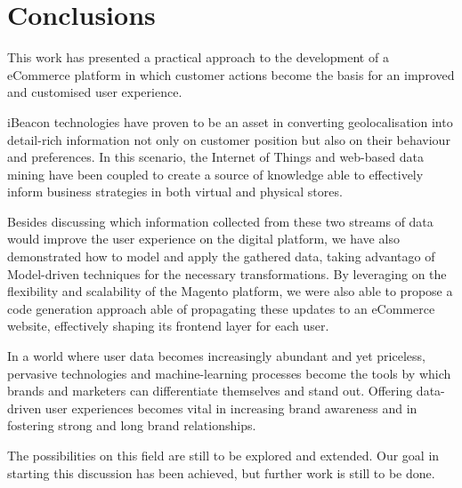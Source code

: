 \chapter*{Conclusions}

This work has presented a practical approach to the development of a eCommerce platform in which customer actions become the basis for an improved and customised user experience.

iBeacon technologies have proven to be an asset in converting geolocalisation into detail-rich information not only on customer position but also on their behaviour and preferences. In this scenario, the Internet of Things and web-based data mining have been coupled to create a source of knowledge able to effectively inform business strategies in both virtual and physical stores.

Besides discussing which information collected from these two streams of data would improve the user experience on the digital platform, we have also demonstrated how to model and apply the gathered data, taking advantago of Model-driven techniques for the necessary transformations. By leveraging on the flexibility and scalability of the Magento platform, we were also able to propose a code generation approach able of propagating these updates to an eCommerce website, effectively shaping its frontend layer for each user.

In a world where user data becomes increasingly abundant and yet priceless, pervasive technologies and machine-learning processes become the tools by which brands and marketers can differentiate themselves and stand out. Offering data-driven user experiences becomes vital in increasing brand awareness and in fostering strong and long brand relationships.

The possibilities on this field are still to be explored and extended. Our goal in starting this discussion has been achieved, but further work is still to be done.

